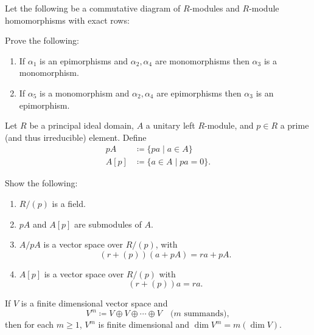\begin{problem}[Hungerford 4.1.12]
Let the following be a commutative diagram of $R$-modules and $R$-module homomorphisms with exact rows:

\begin{center}
\end{center}

Prove the following:
\begin{enumerate}
    \item If $\alpha_1$ is an epimorphisms and $\alpha_2, \alpha_4$ are monomorphisms then $\alpha_3$ is a monomorphism.
    \item If $\alpha_5$ is a monomorphism and $\alpha_2, \alpha_4$ are epimorphisms then $\alpha_3$ is an epimorphism.
\end{enumerate}
\end{problem}

\begin{problem}[Hungerford 4.2.4]
Let $R$ be a principal ideal domain, $A$ a unitary left $R$-module, and $p\in R$ a prime (and thus irreducible) element. Define
\begin{align*}
    pA &\coloneqq \{ pa \mid a\in A\} \\
    A[p] &\coloneqq \{ a\in A \mid pa = 0\}.
\end{align*}

Show the following:
\begin{enumerate}
    \item $R/(p)$ is a field.
    \item $pA$ and $A[p]$ are submodules of $A$.
    \item $A/pA$ is a vector space over $R/(p)$, with 
    \[(r + (p))(a + pA) = ra + pA.\]
    \item $A[p]$ is a vector space over $R/(p)$ with 
    \[(r + (p))a = ra.\]
\end{enumerate}
\end{problem}

\begin{problem}[Hungerford 4.2.8]
If $V$ is a finite dimensional vector space and
\[
V^m \coloneqq V \oplus V \oplus \cdots \oplus V \quad \text{($m$ summands)},
\]
then for each $m\geq 1$, $V^m$ is finite dimensional and $\dim V^m = m(\dim V)$.
\end{problem}

